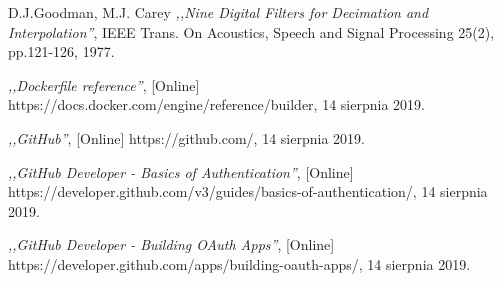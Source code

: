 \begin{thebibliography}{99}
 D.J.Goodman, M.J. Carey \emph{,,Nine Digital Filters for Decimation and Interpolation''}, IEEE Trans. On Acoustics, Speech and Signal Processing 25(2), pp.121-126, 1977.

  \emph{,,Dockerfile reference''}, [Online] https://docs.docker.com/engine/reference/builder, 14 sierpnia 2019.

 \emph{,,GitHub''}, [Online] https://github.com/, 14 sierpnia 2019.

 \emph{,,GitHub Developer - Basics of Authentication''}, [Online] https://developer.github.com/v3/guides/basics-of-authentication/, 14 sierpnia 2019.

 \emph{,,GitHub Developer - Building OAuth Apps''}, [Online] https://developer.github.com/apps/building-oauth-apps/, 14 sierpnia 2019.

\end{thebibliography}
\clearpage




